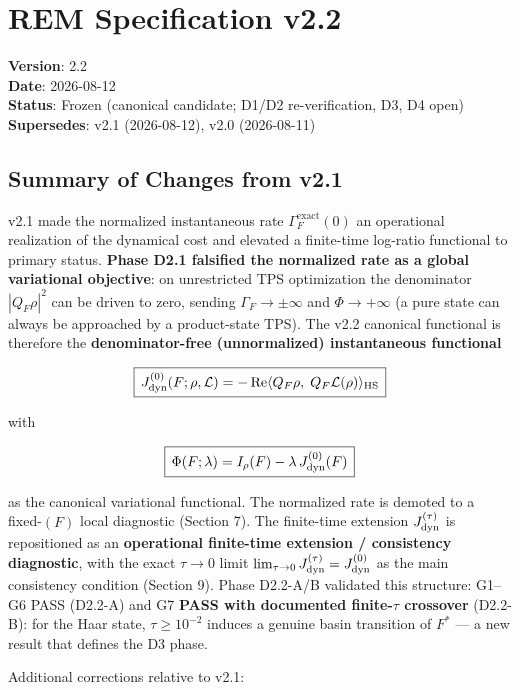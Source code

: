 \documentclass[
]{article}
\author{}
\date{}
\begin{document}
\section{REM Specification v2.2}\label{rem-specification-v2.2}

\textbf{Version}: 2.2\\
\textbf{Date}: 2026-08-12\\
\textbf{Status}: Frozen (canonical candidate; D1/D2 re-verification, D3,
D4 open)\\
\textbf{Supersedes}: v2.1 (2026-08-12), v2.0 (2026-08-11)

\subsection{Summary of Changes from
v2.1}\label{summary-of-changes-from-v2.1}

v2.1 made the normalized instantaneous rate
\(\Gamma_F^{\mathrm{exact}}(0)\) an operational realization of the
dynamical cost and elevated a finite-time log-ratio functional to
primary status. \textbf{Phase D2.1 falsified the normalized rate as a
global variational objective}: on unrestricted TPS optimization the
denominator \(|Q_F\rho|^2\) can be driven to zero, sending
\(\Gamma_F \to \pm\infty\) and \(\Phi \to +\infty\) (a pure state can
always be approached by a product-state TPS). The v2.2 canonical
functional is therefore the \textbf{denominator-free (unnormalized)
instantaneous functional}

\[
\boxed{\,J_{\rm dyn}^{(0)}(F;\rho,\mathcal L) =
-\operatorname{Re}\langle Q_F\rho,\; Q_F\mathcal L(\rho)\rangle_{\mathrm{HS}}\,}
\]

with

\[
\boxed{\,\Phi(F;\lambda) = I_\rho(F) - \lambda\, J_{\rm dyn}^{(0)}(F)\,}
\]

as the canonical variational functional. The normalized rate is demoted
to a fixed-\((F)\) local diagnostic (Section 7). The finite-time
extension \(J_{\rm dyn}^{(\tau)}\) is repositioned as an
\textbf{operational finite-time extension / consistency diagnostic},
with the exact \(\tau\to 0\) limit
\(\lim_{\tau\to0}J_{\rm dyn}^{(\tau)}=J_{\rm dyn}^{(0)}\) as the main
consistency condition (Section 9). Phase D2.2-A/B validated this
structure: G1--G6 PASS (D2.2-A) and G7 \textbf{PASS with documented
finite-\(\tau\) crossover} (D2.2-B): for the Haar state,
\(\tau \ge 10^{-2}\) induces a genuine basin transition of \(F^*\) --- a
new result that defines the D3 phase.

Additional corrections relative to v2.1:
\end{document}
